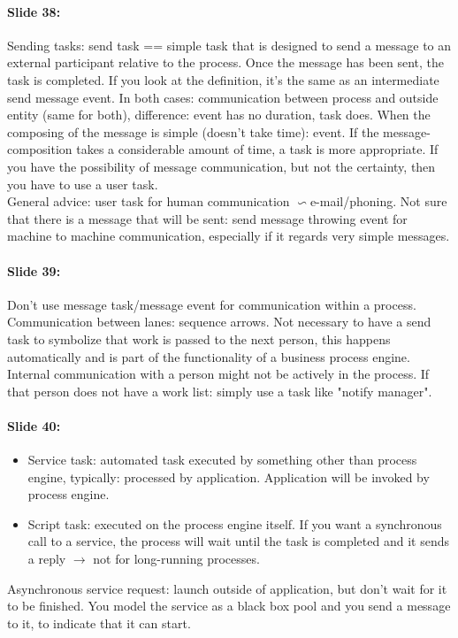 \documentclass[10pt,a4paper]{report}
\begin{document}
\paragraph{Slide 38:}Sending tasks: send task == simple task that is designed to send a message to an external participant relative to the process. Once the message has been sent, the task is completed. If you look at the definition, it's the same as an intermediate send message event. In both cases: communication between process and outside entity (same for both),  difference: event has no duration, task does. When the composing of the message is simple (doesn't take time): event. If the message-composition takes a considerable amount of time, a task is more appropriate. If you have the possibility of message communication, but not the certainty, then you have to use a user task.\\
General advice: user task for human communication $\backsim$e-mail/phoning. Not sure that there is a message that will be sent: send message throwing event for machine to machine communication, especially if it regards very simple messages.

\paragraph{Slide 39:}Don't use message task/message event for communication within a process. Communication between lanes: sequence arrows. Not necessary to have a send task to symbolize that work is passed to the next person, this happens automatically and is part of the functionality of a business process engine. Internal communication with a person might not be actively in the process. If that person does not have a work list: simply use a task like "notify manager".

\paragraph{Slide 40:}
\begin{itemize}
\item Service task: automated task executed by something other than process engine, typically: processed by application. Application will be invoked by process engine.
\item Script task: executed on the process engine itself. If you want a synchronous call to a service, the process will wait until the task is completed and it sends a reply $\rightarrow$ not for long-running processes.
\end{itemize}
Asynchronous service request: launch outside of application, but don't wait for it to be finished. You model the service as a black box pool and you send a message to it, to indicate that it can start.
\end{document}
